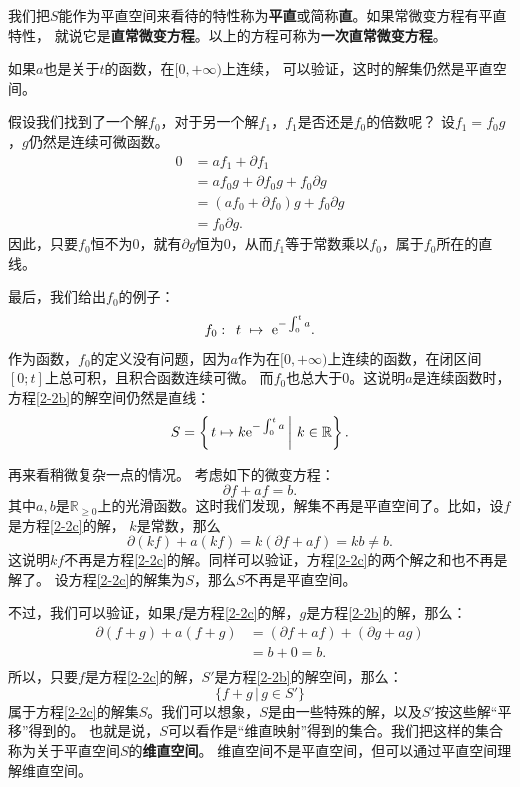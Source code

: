 \documentclass[12pt,UTF8]{ctexbook}
\begin{document}
我们把$S$能作为平直空间来看待的特性称为\textbf{平直}或简称\textbf{直}。如果常微变方程有平直特性，
就说它是\textbf{直常微变方程}。以上的方程可称为\textbf{一次直常微变方程}。

如果$a$也是关于$t$的函数，在$[0,+\infty)$上连续，
可以验证，这时的解集仍然是平直空间。

假设我们找到了一个解$f_0$，对于另一个解$f_1$，$f_1$是否还是$f_0$的倍数呢？
设$f_1 = f_0 g$，$g$仍然是连续可微函数。
\begin{align*}
    0 &= af_1 + \partial f_1 \\
    &= a f_0 g + \partial f_0 g + f_0 \partial g \\
    &= (af_0 + \partial f_0) g + f_0 \partial g \\
    &= f_0 \partial g.
\end{align*}
因此，只要$f_0$恒不为$0$，就有$\partial g$恒为$0$，从而$f_1$等于常数乘以$f_0$，属于$f_0$所在的直线。

最后，我们给出$f_0$的例子：
$$ f_0: \,\,\, t\,\, \mapsto \,\, \mathrm{e}^{-\int_0^t a}. $$
作为函数，$f_0$的定义没有问题，因为$a$作为在$[0,+\infty)$上连续的函数，在闭区间$[0; t]$上总可积，且积合函数连续可微。
而$f_0$也总大于$0$。这说明$a$是连续函数时，方程\eqref{2-2b}的解空间仍然是直线：
$$S = \left\{\left.t\mapsto k\mathrm{e}^{-\int_0^t a} \, \right| \, k\in\mathbb{R}\right\}.$$

再来看稍微复杂一点的情况。
考虑如下的微变方程：
\begin{equation}
    \partial f + a f = b. \label{2-2c}
\end{equation}
其中$a,b$是$\mathbb{R}_{\geqslant 0}$上的光滑函数。这时我们发现，解集不再是平直空间了。比如，设$f$是方程\eqref{2-2c}的解，
$k$是常数，那么
$$\partial (kf) + a (kf) = k (\partial f + a f) = kb \neq b.$$
这说明$kf$不再是方程\eqref{2-2c}的解。同样可以验证，方程\eqref{2-2c}的两个解之和也不再是解了。
设方程\eqref{2-2c}的解集为$S$，那么$S$不再是平直空间。

不过，我们可以验证，如果$f$是方程\eqref{2-2c}的解，$g$是方程\eqref{2-2b}的解，那么：
\begin{align*}
    \partial (f + g) + a (f + g) &= (\partial f + a f) + (\partial g + a g) \\
    &= b + 0 = b. \\ 
\end{align*}
所以，只要$f$是方程\eqref{2-2c}的解，$S'$是方程\eqref{2-2b}的解空间，那么：
$$ \{f + g \, | \, g\in S'\} $$
属于方程\eqref{2-2c}的解集$S$。我们可以想象，$S$是由一些特殊的解，以及$S'$按这些解“平移”得到的。
也就是说，$S$可以看作是“维直映射”得到的集合。我们把这样的集合称为关于平直空间$S$的\textbf{维直空间}。
维直空间不是平直空间，但可以通过平直空间理解维直空间。
\end{document}
